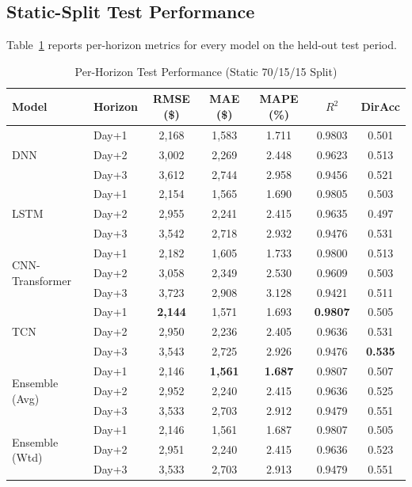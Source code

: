 \documentclass[12pt]{article}
\begin{document}
\subsection{Static-Split Test Performance}

Table~\ref{tab:results} reports per-horizon metrics for every model on the held-out test period.

\begin{table}[h!]
\centering
\small
\caption{Per-Horizon Test Performance (Static 70/15/15 Split)}
\label{tab:results}
\begin{tabular}{@{}llccccc@{}}
\toprule
\textbf{Model} & \textbf{Horizon} & \textbf{RMSE (\$)} & \textbf{MAE (\$)} & \textbf{MAPE (\%)} & \textbf{$R^2$} & \textbf{DirAcc} \\
\midrule
\multirow{3}{*}{DNN}             & Day+1 & 2{,}168 & 1{,}583 & 1.711 & 0.9803 & 0.501 \\
                                 & Day+2 & 3{,}002 & 2{,}269 & 2.448 & 0.9623 & 0.513 \\
                                 & Day+3 & 3{,}612 & 2{,}744 & 2.958 & 0.9456 & 0.521 \\
\midrule
\multirow{3}{*}{LSTM}            & Day+1 & 2{,}154 & 1{,}565 & 1.690 & 0.9805 & 0.503 \\
                                 & Day+2 & 2{,}955 & 2{,}241 & 2.415 & 0.9635 & 0.497 \\
                                 & Day+3 & 3{,}542 & 2{,}718 & 2.932 & 0.9476 & 0.531 \\
\midrule
\multirow{3}{*}{CNN-Transformer} & Day+1 & 2{,}182 & 1{,}605 & 1.733 & 0.9800 & 0.513 \\
                                 & Day+2 & 3{,}058 & 2{,}349 & 2.530 & 0.9609 & 0.503 \\
                                 & Day+3 & 3{,}723 & 2{,}908 & 3.128 & 0.9421 & 0.511 \\
\midrule
\multirow{3}{*}{TCN}             & Day+1 & \textbf{2{,}144} & 1{,}571 & 1.693 & \textbf{0.9807} & 0.505 \\
                                 & Day+2 & 2{,}950 & 2{,}236 & 2.405 & 0.9636 & 0.531 \\
                                 & Day+3 & 3{,}543 & 2{,}725 & 2.926 & 0.9476 & \textbf{0.535} \\
\midrule
\multirow{3}{*}{Ensemble (Avg)}  & Day+1 & 2{,}146 & \textbf{1{,}561} & \textbf{1.687} & 0.9807 & 0.507 \\
                                 & Day+2 & 2{,}952 & 2{,}240 & 2.415 & 0.9636 & 0.525 \\
                                 & Day+3 & 3{,}533 & 2{,}703 & 2.912 & 0.9479 & 0.551 \\
\midrule
\multirow{3}{*}{Ensemble (Wtd)}  & Day+1 & 2{,}146 & 1{,}561 & 1.687 & 0.9807 & 0.505 \\
                                 & Day+2 & 2{,}951 & 2{,}240 & 2.415 & 0.9636 & 0.523 \\
                                 & Day+3 & 3{,}533 & 2{,}703 & 2.913 & 0.9479 & 0.551 \\
\bottomrule
\end{tabular}
\end{table}
\end{document}
